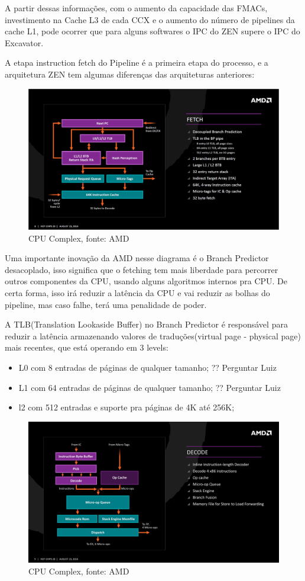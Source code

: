 \documentclass[12pt]{article}
\begin{document}
A partir dessas informações, com o aumento da capacidade das FMACs, investimento na Cache L3 de cada CCX e o aumento do número de pipelines da cache L1, pode ocorrer que para alguns softwares o IPC do ZEN supere o IPC do Excavator.

A etapa instruction fetch do Pipeline é a primeira etapa do processo, e a arquitetura ZEN tem algumas diferenças das arquiteturas anteriores:

\begin{figure}[ht]
\centering
\includegraphics[width=115mm,scale=0.8]{AMD-Zen_Fetch.png}
\caption{CPU Complex, fonte: AMD}
\label{fig:AMD CORE}
\end{figure}

Uma importante inovação da AMD nesse diagrama é o Branch Predictor desacoplado, isso significa que o fetching tem mais liberdade para percorrer outros componentes da CPU, usando alguns algoritmos internos pra CPU. De certa forma, isso irá reduzir a latência da CPU e vai reduzir as bolhas do pipeline, mas caso falhe, terá uma penalidade de poder.

A TLB(Translation Lookaside Buffer) no Branch Predictor é responsável para reduzir a latência armazenando valores de traduções(virtual page - physical page) mais recentes, que está operando em 3 levels:

\begin{itemize}
	\item L0 com 8 entradas de páginas de qualquer tamanho; ?? Perguntar Luiz
	\item L1 com 64 entradas de páginas de qualquer tamanho; ?? Perguntar Luiz
	\item l2 com 512 entradas e suporte pra páginas de 4K até 256K;
\end{itemize}

\begin{figure}[ht]
\centering
\includegraphics[width=115mm,scale=0.5]{amd-zen-decode.jpg}
\caption{CPU Complex, fonte: AMD}
\label{fig:AMD CORE}
\end{figure}
\end{document}
